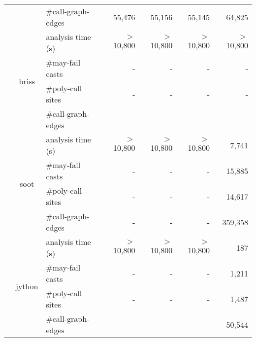 \begin{table}[]
\begin{tabular}{@{}c|clrrrr@{}}
&                         & \#call-graph-edges & 55,476                & 55,156                & 55,145                & 64,825                \\\cmidrule(){2-7}
&\multirow{4}{*}{briss}   & analysis time (s)  & $>$10,800 & $>$10,800 & $>$10,800 & $>$10,800 \\
&                         & \#may-fail casts   & -                    & -                    & -                    & -                    \\
&                         & \#poly-call sites  & -                    & -                    & -                    & -                    \\%
&                         & \#call-graph-edges & -                    & -                    & -                    & -                    \\\cmidrule(){2-7}
&\multirow{4}{*}{soot}    & analysis time (s)  & $>$10,800 & $>$10,800 & $>$10,800 & 7,741                 \\
&                         & \#may-fail casts   & -                    & -                    & -                    & 15,885                \\
&                         & \#poly-call sites  & -                    & -                    & -                    & 14,617                \\%
&                         & \#call-graph-edges & -                    & -                    & -                    & 359,358               \\\cmidrule(){2-7}
&\multirow{4}{*}{jython}  & analysis time (s)  & $>$10,800 & $>$10,800 & $>$10,800 & 187                  \\
&                         & \#may-fail casts   & -                    & -                    & -                    & 1,211                 \\
&                         & \#poly-call sites  & -                    & -                    & -                    & 1,487                 \\%
&                         & \#call-graph-edges & -                    & -                    & -                    & 50,544                \\ \bottomrule
\end{tabular}
\end{table}